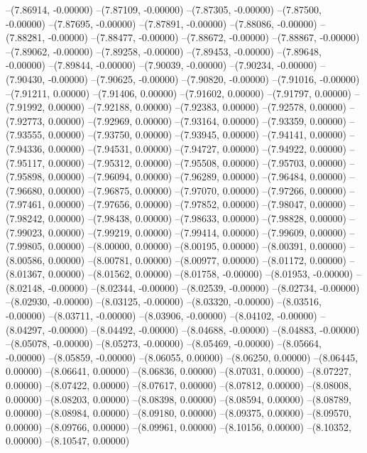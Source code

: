 --(7.86914, -0.00000)
--(7.87109, -0.00000)
--(7.87305, -0.00000)
--(7.87500, -0.00000)
--(7.87695, -0.00000)
--(7.87891, -0.00000)
--(7.88086, -0.00000)
--(7.88281, -0.00000)
--(7.88477, -0.00000)
--(7.88672, -0.00000)
--(7.88867, -0.00000)
--(7.89062, -0.00000)
--(7.89258, -0.00000)
--(7.89453, -0.00000)
--(7.89648, -0.00000)
--(7.89844, -0.00000)
--(7.90039, -0.00000)
--(7.90234, -0.00000)
--(7.90430, -0.00000)
--(7.90625, -0.00000)
--(7.90820, -0.00000)
--(7.91016, -0.00000)
--(7.91211, 0.00000)
--(7.91406, 0.00000)
--(7.91602, 0.00000)
--(7.91797, 0.00000)
--(7.91992, 0.00000)
--(7.92188, 0.00000)
--(7.92383, 0.00000)
--(7.92578, 0.00000)
--(7.92773, 0.00000)
--(7.92969, 0.00000)
--(7.93164, 0.00000)
--(7.93359, 0.00000)
--(7.93555, 0.00000)
--(7.93750, 0.00000)
--(7.93945, 0.00000)
--(7.94141, 0.00000)
--(7.94336, 0.00000)
--(7.94531, 0.00000)
--(7.94727, 0.00000)
--(7.94922, 0.00000)
--(7.95117, 0.00000)
--(7.95312, 0.00000)
--(7.95508, 0.00000)
--(7.95703, 0.00000)
--(7.95898, 0.00000)
--(7.96094, 0.00000)
--(7.96289, 0.00000)
--(7.96484, 0.00000)
--(7.96680, 0.00000)
--(7.96875, 0.00000)
--(7.97070, 0.00000)
--(7.97266, 0.00000)
--(7.97461, 0.00000)
--(7.97656, 0.00000)
--(7.97852, 0.00000)
--(7.98047, 0.00000)
--(7.98242, 0.00000)
--(7.98438, 0.00000)
--(7.98633, 0.00000)
--(7.98828, 0.00000)
--(7.99023, 0.00000)
--(7.99219, 0.00000)
--(7.99414, 0.00000)
--(7.99609, 0.00000)
--(7.99805, 0.00000)
--(8.00000, 0.00000)
--(8.00195, 0.00000)
--(8.00391, 0.00000)
--(8.00586, 0.00000)
--(8.00781, 0.00000)
--(8.00977, 0.00000)
--(8.01172, 0.00000)
--(8.01367, 0.00000)
--(8.01562, 0.00000)
--(8.01758, -0.00000)
--(8.01953, -0.00000)
--(8.02148, -0.00000)
--(8.02344, -0.00000)
--(8.02539, -0.00000)
--(8.02734, -0.00000)
--(8.02930, -0.00000)
--(8.03125, -0.00000)
--(8.03320, -0.00000)
--(8.03516, -0.00000)
--(8.03711, -0.00000)
--(8.03906, -0.00000)
--(8.04102, -0.00000)
--(8.04297, -0.00000)
--(8.04492, -0.00000)
--(8.04688, -0.00000)
--(8.04883, -0.00000)
--(8.05078, -0.00000)
--(8.05273, -0.00000)
--(8.05469, -0.00000)
--(8.05664, -0.00000)
--(8.05859, -0.00000)
--(8.06055, 0.00000)
--(8.06250, 0.00000)
--(8.06445, 0.00000)
--(8.06641, 0.00000)
--(8.06836, 0.00000)
--(8.07031, 0.00000)
--(8.07227, 0.00000)
--(8.07422, 0.00000)
--(8.07617, 0.00000)
--(8.07812, 0.00000)
--(8.08008, 0.00000)
--(8.08203, 0.00000)
--(8.08398, 0.00000)
--(8.08594, 0.00000)
--(8.08789, 0.00000)
--(8.08984, 0.00000)
--(8.09180, 0.00000)
--(8.09375, 0.00000)
--(8.09570, 0.00000)
--(8.09766, 0.00000)
--(8.09961, 0.00000)
--(8.10156, 0.00000)
--(8.10352, 0.00000)
--(8.10547, 0.00000)
